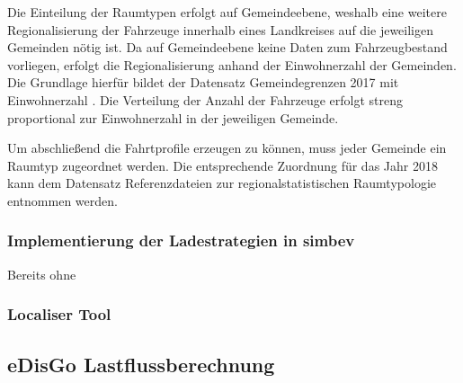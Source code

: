 Die Einteilung der \Regiostar Raumtypen erfolgt auf Gemeindeebene, weshalb eine weitere Regionalisierung der Fahrzeuge innerhalb eines Landkreises auf die jeweiligen Gemeinden nötig ist.
Da auf Gemeindeebene keine Daten zum Fahrzeugbestand vorliegen, erfolgt die Regionalisierung anhand der Einwohnerzahl der Gemeinden.
Die Grundlage hierfür bildet der Datensatz \glqq Gemeindegrenzen 2017 mit Einwohnerzahl\grqq{} \cite[][Stand: ]{EDG2020}.
Die Verteilung der Anzahl der Fahrzeuge erfolgt streng proportional zur Einwohnerzahl in der jeweiligen Gemeinde.\medskip

Um abschließend die Fahrtprofile erzeugen zu können, muss jeder Gemeinde ein \Regiostar Raumtyp zugeordnet werden.
Die entsprechende Zuordnung für das Jahr \num{2018} kann dem Datensatz \glqq Referenzdateien zur regionalstatistischen Raumtypologie\grqq{} \cite[][Stand: ]{BMVIa2020} entnommen werden.\medskip



\subsubsection{Implementierung der Ladestrategien in simbev}

Bereits ohne 


\subsubsection{Localiser Tool}


\subsection{eDisGo Lastflussberechnung}